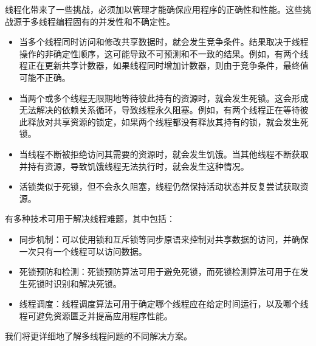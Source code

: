 线程化带来了一些挑战，必须加以管理才能确保应用程序的正确性和性能。这些挑战源于多线程编程固有的并发性和不确定性。

\begin{itemize}
\item
当多个线程同时访问和修改共享数据时，就会发生竞争条件。结果取决于线程操作的非确定性顺序，这可能导致不可预测和不一致的结果。例如，有两个线程正在更新共享计数器，如果线程同时增加计数器，则由于竞争条件，最终值可能不正确。

\item
当两个或多个线程无限期地等待彼此持有的资源时，就会发生死锁。这会形成无法解决的依赖关系循环，导致线程永久阻塞。例如，有两个线程正在等待彼此释放对共享资源的锁定，如果两个线程都没有释放其持有的锁，就会发生死锁。

\item
当线程不断被拒绝访问其需要的资源时，就会发生饥饿。当其他线程不断获取并持有资源，导致饥饿线程无法执行时，就会发生这种情况。

\item
活锁类似于死锁，但不会永久阻塞，线程仍然保持活动状态并反复尝试获取资源。
\end{itemize}

有多种技术可用于解决线程难题，其中包括：

\begin{itemize}
\item
同步机制：可以使用锁和互斥锁等同步原语来控制对共享数据的访问，并确保一次只有一个线程可以访问数据。

\item
死锁预防和检测：死锁预防算法可用于避免死锁，而死锁检测算法可用于在发生死锁时识别和解决死锁。

\item
线程调度：线程调度算法可用于确定哪个线程应在给定时间运行，以及哪个线程可避免资源匮乏并提高应用程序性能。
\end{itemize}

我们将更详细地了解多线程问题的不同解决方案。















